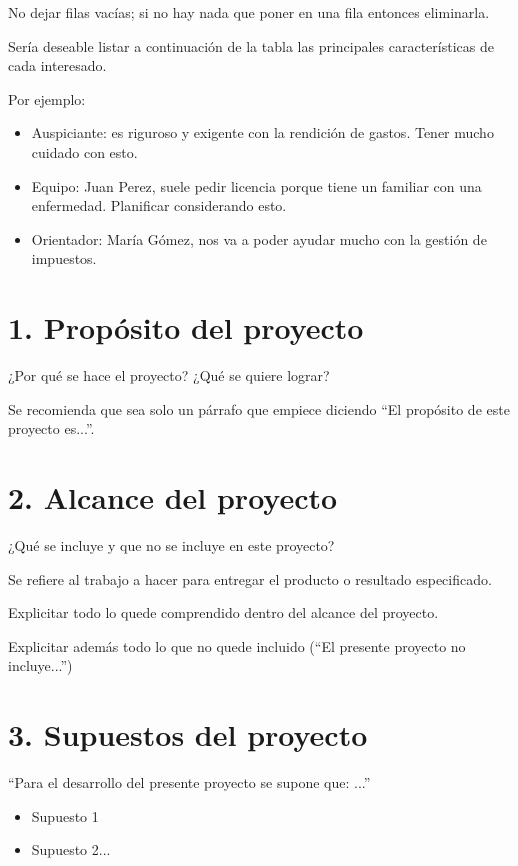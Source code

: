 \documentclass[11pt]{charter}
\begin{document}
No dejar filas vacías; si no hay nada que poner en una fila entonces eliminarla.

Sería deseable listar a continuación de la tabla las principales características de cada interesado.
 
Por ejemplo:
\begin{itemize}
\item Auspiciante: es riguroso y exigente con la rendición de gastos. Tener mucho cuidado con esto.
\item Equipo: Juan Perez, suele pedir licencia porque tiene un familiar con una enfermedad. Planificar considerando esto.
\item Orientador: María Gómez, nos va a poder ayudar mucho con la gestión de impuestos.
\end{itemize}




\section{1. Propósito del proyecto}
\label{sec:proposito}

¿Por qué se hace el proyecto? ¿Qué se quiere lograr? 

Se recomienda que sea solo un párrafo que empiece diciendo ``El propósito de este proyecto es...''.


\section{2. Alcance del proyecto}
\label{sec:alcance}

¿Qué se incluye y que no se incluye en este proyecto?

Se refiere al trabajo a hacer para entregar el producto o resultado especificado. 

Explicitar todo lo quede comprendido dentro del alcance del proyecto.

Explicitar además todo lo que no quede incluido (``El presente proyecto no incluye...'')




\section{3. Supuestos del proyecto}
\label{sec:supuestos}

``Para el desarrollo del presente proyecto se supone que: ...''

\begin{itemize}
\item Supuesto 1
\item Supuesto 2...
\end{itemize}
\end{document}
